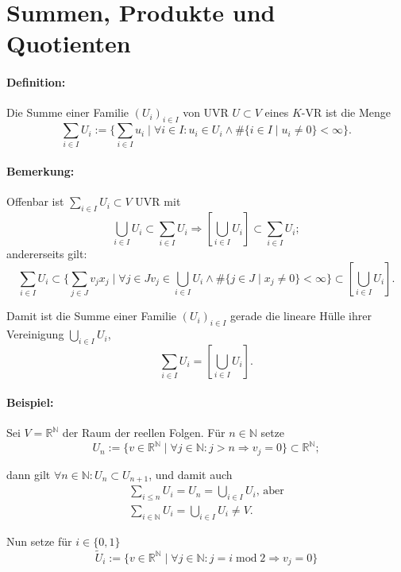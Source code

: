 \section{Summen, Produkte und Quotienten}
\paragraph{Definition: }
	Die Summe einer Familie $ (U_i)_{i\in I} $ von UVR $ U\subset V $ eines $ K $-VR ist die Menge
		\begin{equation*}
		\sum_{i\in I} U_i := \{\sum_{i \in I}u_i\mid \forall i\in I: u_i\in U_i \land \# \{i\in I\mid u_i \neq 0\}<\infty\}.
		\end{equation*}
		
\paragraph{Bemerkung: }
	Offenbar ist $ \sum_{i\in I} U_i\subset V $ UVR mit
	\[  \bigcup_{i\in I}U_i \subset \sum_{i\in I} U_i \Rightarrow [\bigcup_{i\in I}U_i]\subset \sum_{i\in I} U_i; \]
	andererseits gilt:
	\[ \sum_{i\in I}U_i \subset \{\sum_{j\in J}v_jx_j\mid \forall j\in Jv_j\in \bigcup_{i\in I}U_i \land \#\{j\in J\mid x_j\neq 0\}<\infty\}\subset [\bigcup_{i\in I}U_i]. \]
	
	Damit ist die Summe einer Familie $ (U_i)_{i\in I} $ gerade die lineare Hülle ihrer Vereinigung $ \bigcup_{i\in I}U_i $,
	\[ \sum_{i\in I}U_i= [\bigcup_{i\in I}U_i]. \]
		
\paragraph{Beispiel: }
	Sei $ V=\mathbb{R}^\mathbb{N} $ der Raum der reellen Folgen. Für $ n\in \mathbb{N} $ setze
		\begin{equation*}
		U_n := \{v\in \mathbb{R}^\mathbb{N}\mid \forall j\in \mathbb{N}: j>n\Rightarrow v_j = 0 \} \subset \mathbb{R}^\mathbb{N};
		\end{equation*}
		
	dann gilt $ \forall n\in \mathbb{N}: U_n\subset U_{n+1} $, und damit auch
		\begin{gather*}
		\sum_{i\leq n} U_i = U_n = \bigcup_{i\in I}U_i \text{, aber}\\
		\sum_{i\in \mathbb{N}}U_i = \bigcup_{i\in I}U_i \neq V.
		\end{gather*}
		
	Nun setze für $ i\in \{0,1\} $
		\begin{equation*}
		\tilde{U}_i := \{v\in \mathbb{R}^\mathbb{N}\mid \forall j\in \mathbb{N}: j=i\operatorname{mod} 2\Rightarrow v_j = 0\}
		\end{equation*}
		
